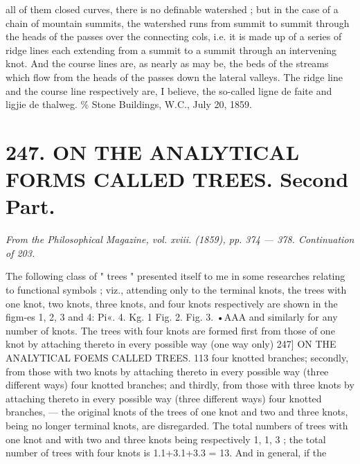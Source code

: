 \documentclass[11pt,a4paper]{book}
\begin{document}
all  of  them  closed  curves,  there  is  no  definable  watershed ;  but  in  the  case  of  a  chain
of  mountain  summits,  the  watershed  runs  from  summit  to  summit  through  the  heads
of  the  passes  over  the  connecting  cols,  i.e.  it  is  made  up  of  a  series  of  ridge  lines
each  extending  from  a  summit  to  a  summit  through  an  intervening  knot.  And  the
course  lines  are,  as  nearly  as  may  be,  the  beds  of  the  streams  which  flow  from  the
heads  of  the  passes  down  the  lateral  valleys.  The  ridge  line  and  the  course  line
respectively  are,  I  believe,  the  so-called  ligne  de  faite  and  ligjie  de  thalweg.
\%  Stone  Buildings,  W.C.,  July  20,  1859.


\newpage

\section*{247. ON    THE    ANALYTICAL    FORMS    CALLED    TREES.     Second    Part.}
\begin{flushright}
\textit{From  the  Philosophical  Magazine,  vol.  xviii.  (1859),  pp.  374 — 378.     Continuation  of  203.}\n\end{flushright}
\vspace{0.5em}
The  following  class  of  "  trees "  presented  itself  to  me  in  some  researches  relating
to  functional  symbols ;  viz.,  attending  only  to  the  terminal  knots,  the  trees  with  one
knot,  two  knots,  three  knots,  and  four  knots  respectively  are  shown  in  the  figm-es
1,  2,   3  and  4:
Pi«.  4.
Kg.  1         Fig.  2.
Fig.  3.
•AAA
and   similarly   for   any   number   of    knots.     The    trees   with   four   knots   are    formed   first
from   those   of    one    knot    by   attaching    thereto    in   every   possible   way   (one   way   only)
247]  ON    THE   ANALYTICAL   FOEMS   CALLED   TREES.  113
four  knotted  branches;  secondly,  from  those  with  two  knots  by  attaching  thereto  in
every  possible  way  (three  different  ways)  four  knotted  branches;  and  thirdly,  from
those  with  three  knots  by  attaching  thereto  in  every  possible  way  (three  different  ways)
four  knotted  branches, — the  original  knots  of  the  trees  of  one  knot  and  two  and  three
knots,  being  no  longer  terminal  knots,  are  disregarded.  The  total  numbers  of  trees
with  one  knot  and  with  two  and  three  knots  being  respectively  1,  1,  3 ;  the  total
number  of  trees  with  four  knots  is  1.1+3.1+3.3  =  13.  And  in  general,  if  the
\end{document}
